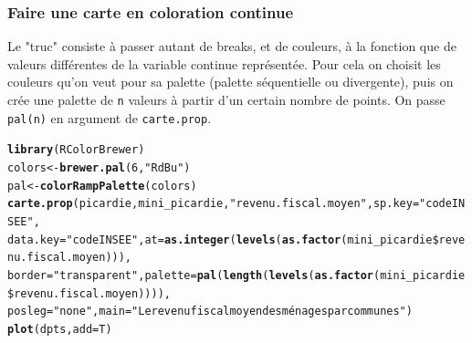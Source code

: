 \documentclass[slidetop, 10pt]{beamer}\usepackage{graphicx, color}
\makeatletter
\newcommand{\hlfunctioncall}[1]{\textcolor[rgb]{0.501960784313725,0,0.329411764705882}{\textbf{#1}}}%
\newcommand{\hlstring}[1]{\textcolor[rgb]{0.6,0.6,1}{#1}}%
\newenvironment{kframe}{%
 \def\at@end@of@kframe{}%
 \ifinner\ifhmode%
  \def\at@end@of@kframe{\end{minipage}}%
  \begin{minipage}{\columnwidth}%
 \fi\fi%
 \def\FrameCommand##1{\hskip\@totalleftmargin \hskip-\fboxsep
 \colorbox{shadecolor}{##1}\hskip-\fboxsep
     \hskip-\linewidth \hskip-\@totalleftmargin \hskip\columnwidth}%
 \MakeFramed {\advance\hsize-\width
   \@totalleftmargin\z@ \linewidth\hsize
   \@setminipage}}%
 {\par\unskip\endMakeFramed%
 \at@end@of@kframe}
\newenvironment{knitrout}{}{} %
\renewenvironment{knitrout}{\begin{tiny}}{\end{tiny}}
\makeatother
\begin{document}
\begin{frame}[fragile]
\frametitle{Faire une carte en coloration continue}

Le "truc" consiste à passer autant de breaks, et de couleurs, à la fonction que de valeurs différentes de la variable continue représentée. Pour cela on choisit les couleurs qu'on veut pour sa palette (palette séquentielle ou divergente), puis on crée une palette de \verb!n! valeurs à partir d'un certain nombre de points. On passe \verb!pal(n)! en argument de \verb!carte.prop!.

\begin{knitrout}\tiny
{}\color{fgcolor}\begin{kframe}
\begin{alltt}
\hlfunctioncall{library}(RColorBrewer)
colors <- \hlfunctioncall{brewer.pal}(6, \hlstring{"RdBu"})
pal <- \hlfunctioncall{colorRampPalette}(colors)
\hlfunctioncall{carte.prop}(picardie, mini\_picardie, \hlstring{"revenu.fiscal.moyen"}, sp.key = \hlstring{"codeINSEE"}, 
    data.key = \hlstring{"codeINSEE"}, at = \hlfunctioncall{as.integer}(\hlfunctioncall{levels}(\hlfunctioncall{as.factor}(mini\_picardie\$revenu.fiscal.moyen))), 
    border = \hlstring{"transparent"}, palette = \hlfunctioncall{pal}(\hlfunctioncall{length}(\hlfunctioncall{levels}(\hlfunctioncall{as.factor}(mini\_picardie\$revenu.fiscal.moyen)))), 
    posleg = \hlstring{"none"}, main = \hlstring{"Le revenu fiscal moyen des ménages par communes"})
\hlfunctioncall{plot}(dpts, add = T)
\end{alltt}
\end{kframe}
\end{knitrout}

\end{frame}
\end{document}
